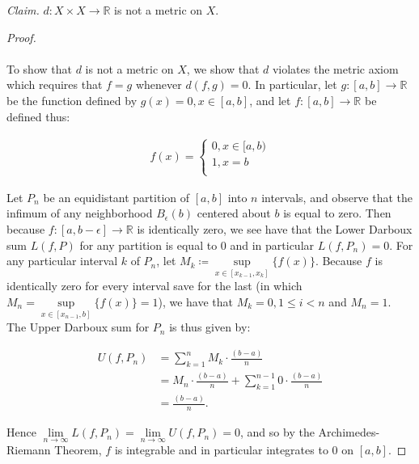     \emph{Claim.} $d: X \times X \to \mathbb{R}$ is not a metric on $X$.
    \ \\

    \begin{proof}\ \\\\
        To show that $d$ is not a metric on $X$, we show that $d$ violates the metric axiom which requires
        that $f = g$ whenever $d(f, g) = 0$. In particular, let $g:[a, b] \to \mathbb{R}$ be the function defined
        by $g(x) = 0, x \in [a, b]$, and let $f:[a, b] \to \mathbb{R}$ be defined thus:

        \begin{align*}
            f(x) = \begin{cases}
                0, x \in [a, b) \\
                1, x = b \\
            \end{cases}
        \end{align*}

        Let $P_n$ be an equidistant partition of $[a, b]$ into $n$ intervals, and observe that the infimum of any 
        neighborhood $B_{\epsilon}(b)$ centered about $b$ is equal to zero. Then because \linebreak
        $f:[a, b - \epsilon] \to \mathbb{R}$ is identically zero, we see have that the Lower Darboux sum $L(f, P)$
        for any partition is equal to 0 and in particular $L(f, P_n) = 0$. For any particular interval $k$ of $P_n$, let 
        $M_k \coloneqq \sup\limits_{x \in [x_{k-1}, x_{k}]}{\{f(x)\}}$. Because $f$ is identically zero for every 
        interval save for the last (in which $M_n = \sup\limits_{x \in [x_{n-1}, b]}{\{f(x)\}} = 1$), we have that 
        $M_k = 0, 1 \le i < n$ and $M_n = 1$. The Upper Darboux sum for $P_n$ is thus given by:

        \begin{align*}
            U(f, P_n) &= \sum\limits_{k=1}^{n}{M_k \cdot \frac{(b - a)}{n}} \\
                      &= M_n \cdot \frac{(b - a)}{n} + \sum\limits_{k=1}^{n-1}{0 \cdot \frac{(b - a)}{n}} \\
                      &= \frac{(b - a)}{n}.
        \end{align*}

        Hence $\lim\limits_{n \to \infty}{L(f, P_n)} = \lim\limits_{n \to \infty}{U(f, P_n)} = 0$, and so by the 
        Archimedes-Riemann Theorem, $f$ is integrable and in particular integrates to 0 on $[a, b]$.
        

\end{proof}
